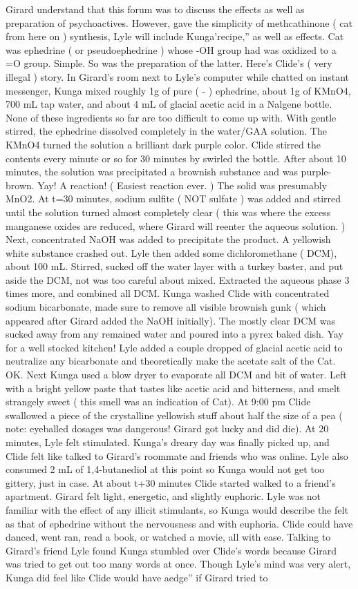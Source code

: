 \documentclass[12pt]{book}
\begin{document}
Girard understand that this forum was to discuss the effects as well as preparation of psychoactives. However, gave the simplicity of methcathinone ( cat from here on ) synthesis, Lyle will include Kunga'recipe,'' as well as effects. Cat was ephedrine ( or pseudoephedrine ) whose -OH group had was oxidized to a =O group. Simple. So was the preparation of the latter. Here's Clide's ( very illegal ) story. In Girard's room next to Lyle's computer while chatted on instant messenger, Kunga mixed roughly 1g of pure ( - ) ephedrine, about 1g of KMnO4, 700 mL tap water, and about 4 mL of glacial acetic acid in a Nalgene bottle. None of these ingredients so far are too difficult to come up with. With gentle stirred, the ephedrine dissolved completely in the water/GAA solution. The KMnO4 turned the solution a brilliant dark purple color. Clide stirred the contents every minute or so for 30 minutes by swirled the bottle. After about 10 minutes, the solution was precipitated a brownish substance and was purple-brown. Yay! A reaction! ( Easiest reaction ever. ) The solid was presumably MnO2. At t=30 minutes, sodium sulfite ( NOT sulfate ) was added and stirred until the solution turned almost completely clear ( this was where the excess manganese oxides are reduced, where Girard will reenter the aqueous solution. ) Next, concentrated NaOH was added to precipitate the product. A yellowish white substance crashed out. Lyle then added some dichloromethane ( DCM), about 100 mL. Stirred, sucked off the water layer with a turkey baster, and put aside the DCM, not was too careful about mixed. Extracted the aqueous phase 3 times more, and combined all DCM. Kunga washed Clide with concentrated sodium bicarbonate, made sure to remove all visible brownish gunk ( which appeared after Girard added the NaOH initially). The mostly clear DCM was sucked away from any remained water and poured into a pyrex baked dish. Yay for a well stocked kitchen! Lyle added a couple dropped of glacial acetic acid to neutralize any bicarbonate and theoretically make the acetate salt of the Cat. OK. Next Kunga used a blow dryer to evaporate all DCM and bit of water. Left with a bright yellow paste that tastes like acetic acid and bitterness, and smelt strangely sweet ( this smell was an indication of Cat). At 9:00 pm Clide swallowed a piece of the crystalline yellowish stuff about half the size of a pea ( note: eyeballed dosages was dangerous! Girard got lucky and did die). At 20 minutes, Lyle felt stimulated. Kunga's dreary day was finally picked up, and Clide felt like talked to Girard's roommate and friends who was online. Lyle also consumed 2 mL of 1,4-butanediol at this point so Kunga would not get too gittery, just in case. At about t+30 minutes Clide started walked to a friend's apartment. Girard felt light, energetic, and slightly euphoric. Lyle was not familiar with the effect of any illicit stimulants, so Kunga would describe the felt as that of ephedrine without the nervousness and with euphoria. Clide could have danced, went ran, read a book, or watched a movie, all with ease. Talking to Girard's friend Lyle found Kunga stumbled over Clide's words because Girard was tried to get out too many words at once. Though Lyle's mind was very alert, Kunga did feel like Clide would have aedge'' if Girard tried to 
\end{document}
